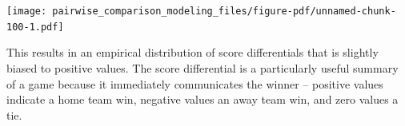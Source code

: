 \documentclass[
  letterpaper,
  DIV=11,
  numbers=noendperiod]{scrartcl}
\newenvironment{Shaded}{\begin{snugshade}}{\end{snugshade}}
\newcommand{\AttributeTok}[1]{\textcolor[rgb]{0.40,0.45,0.13}{#1}}
\newcommand{\DecValTok}[1]{\textcolor[rgb]{0.68,0.00,0.00}{#1}}
\newcommand{\FunctionTok}[1]{\textcolor[rgb]{0.28,0.35,0.67}{#1}}
\newcommand{\NormalTok}[1]{\textcolor[rgb]{0.00,0.23,0.31}{#1}}
\newcommand{\SpecialCharTok}[1]{\textcolor[rgb]{0.37,0.37,0.37}{#1}}
\newcommand{\StringTok}[1]{\textcolor[rgb]{0.13,0.47,0.30}{#1}}
\begin{document}
\begin{Shaded}
\end{Shaded}

\texttt{[image: pairwise\_comparison\_modeling\_files/figure-pdf/unnamed-chunk-100-1.pdf]}

This results in an empirical distribution of score differentials that is
slightly biased to positive values. The score differential is a
particularly useful summary of a game because it immediately
communicates the winner -- positive values indicate a home team win,
negative values an away team win, and zero values a tie.

\begin{Shaded}
\end{Shaded}
\end{document}
